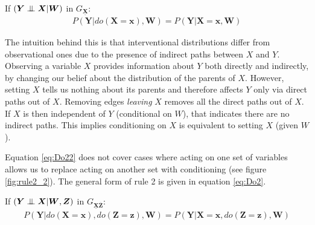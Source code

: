\documentclass[11pt,a4paper,twoside]{report}
\newcommand{\eqn}[1]{\begin{align}#1\end{align}}
\theoremstyle{plain}
\theoremstyle{definition}
\newcommand{\ci}{\mathrel{\perp\mspace{-10mu}\perp}}
\begin{document}
If  $(\boldsymbol{Y} \ci \boldsymbol{X}|\boldsymbol{W})$ in $G_{\underline{\boldsymbol{X}}}$:
\eqn{
\label{eq:Do22}
P(\boldsymbol{Y}|do(\boldsymbol{X}=\boldsymbol{x}),\boldsymbol{W}) = P(\boldsymbol{Y}|\boldsymbol{X}=\boldsymbol{x},\boldsymbol{W})
}

The intuition behind this is that interventional distributions differ from observational ones due to the presence of indirect paths between $X$ and $Y$. Observing a variable $X$ provides information about $Y$ both directly and indirectly, by changing our belief about the distribution of the parents of $X$. However, setting $X$ tells us nothing about its parents and therefore affects $Y$ only via direct paths out of $X$. Removing edges \emph{leaving} $X$ removes all the direct paths out of $X$. If $X$ is then independent of $Y$ (conditional on $W$), that indicates there are no indirect paths. This implies conditioning on $X$ is equivalent to setting $X$ (given $W$).

Equation \ref{eq:Do22} does not cover cases where acting on one set of variables allows us to replace acting on another set with conditioning (see figure \ref{fig:rule2_2}). The general form of rule 2 is given in equation \ref{eq:Do2}.

If  $(\boldsymbol{Y} \ci \boldsymbol{X}|\boldsymbol{W},\boldsymbol{Z})$ in $G_{\underline{\boldsymbol{X}}\overline{\boldsymbol{Z}}}$:
\eqn{
\label{eq:Do2}
P(\boldsymbol{Y}|do(\boldsymbol{X}=\boldsymbol{x}),
do(\boldsymbol{Z}=\boldsymbol{z}),
\boldsymbol{W}) = P(\boldsymbol{Y}|\boldsymbol{X}=\boldsymbol{x},do(\boldsymbol{Z}=\boldsymbol{z}),\boldsymbol{W})
}
\end{document}
